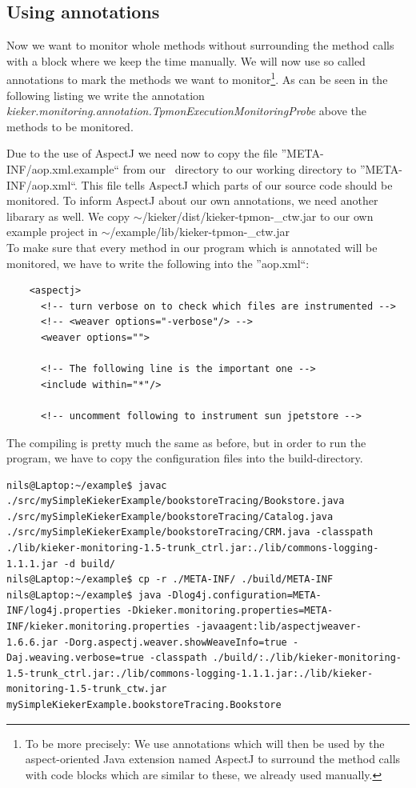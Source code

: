 \documentclass[a4paper, oneside, 11pt]{scrartcl}
\begin{document}
    \subsection{Using annotations}
      Now we want to monitor whole methods without surrounding the method calls with a block where we keep the time manually. We will now use so called annotations to mark the methods we want to monitor\footnote{To be more precisely: We use annotations which will then be used by the aspect-oriented Java extension named AspectJ to surround the method calls with code blocks which are similar to these, we already used manually.}. As can be seen in the following listing we write the annotation \textit{kieker.monitoring.annotation.TpmonExecutionMonitoringProbe} above the methods to be monitored. 
      \setJavaCodeListing
      \lstset{caption=Bookstore.java, label=listing:Bookstore2.java}
      
      Due to the use of AspectJ we need now to copy the file ''META-INF/aop.xml.example`` from our \Kieker\ directory to our working directory to ''META-INF/aop.xml``. This file tells AspectJ which parts of our source code should be monitored. To inform AspectJ about our own annotations, we need another libarary as well. We copy $\sim$/kieker/dist/kieker-tpmon-\version\_ctw.jar to our own example project in $\sim$/example/lib/kieker-tpmon-\version\_ctw.jar\\
      To make sure that every method in our program which is annotated will be monitored, we have to write the following into the ''aop.xml``:
      \setXMLListing 
      \begin{lstlisting}
	<aspectj>
	  <!-- turn verbose on to check which files are instrumented -->
	  <!-- <weaver options="-verbose"/> -->
	  <weaver options="">
	      
	  <!-- The following line is the important one -->
	  <include within="*"/> 

	  <!-- uncomment following to instrument sun jpetstore -->
      \end{lstlisting}
The compiling is pretty much the same as before, but in order to run the program, we have to copy the configuration files into the build-directory.
\begin{lstlisting}
nils@Laptop:~/example$ javac ./src/mySimpleKiekerExample/bookstoreTracing/Bookstore.java ./src/mySimpleKiekerExample/bookstoreTracing/Catalog.java ./src/mySimpleKiekerExample/bookstoreTracing/CRM.java -classpath ./lib/kieker-monitoring-1.5-trunk_ctrl.jar:./lib/commons-logging-1.1.1.jar -d build/
nils@Laptop:~/example$ cp -r ./META-INF/ ./build/META-INF
nils@Laptop:~/example$ java -Dlog4j.configuration=META-INF/log4j.properties -Dkieker.monitoring.properties=META-INF/kieker.monitoring.properties -javaagent:lib/aspectjweaver-1.6.6.jar -Dorg.aspectj.weaver.showWeaveInfo=true -Daj.weaving.verbose=true -classpath ./build/:./lib/kieker-monitoring-1.5-trunk_ctrl.jar:./lib/commons-logging-1.1.1.jar:./lib/kieker-monitoring-1.5-trunk_ctw.jar mySimpleKiekerExample.bookstoreTracing.Bookstore
\end{lstlisting}
\end{document}
